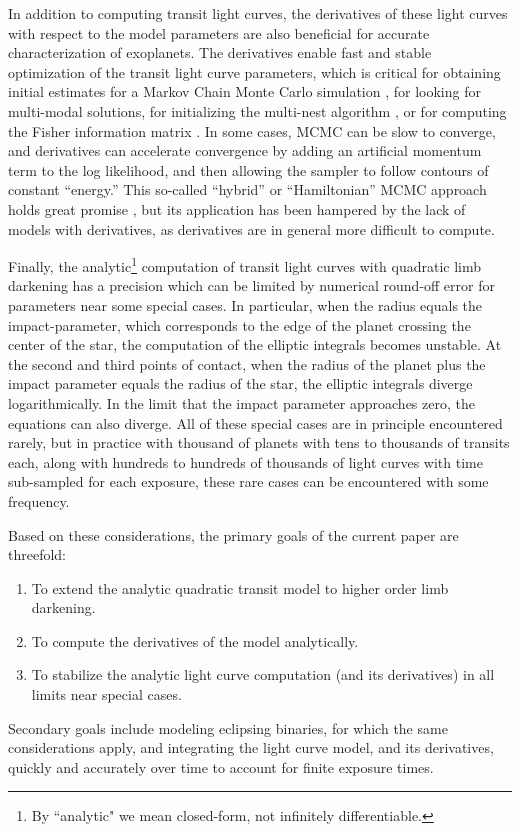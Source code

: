 \documentclass[modern,trackchanges]{aastex63}
\begin{document}
In addition to computing transit light curves, the derivatives of these light
curves with respect to the model parameters are also beneficial for accurate
characterization of exoplanets.   The derivatives enable fast and stable
optimization of the transit light curve parameters, which is critical for
obtaining initial estimates for a Markov Chain Monte Carlo simulation
\citep[MCMC; e.g.][]{Ford2005,Ford2006},
for looking for multi-modal solutions, for initializing the multi-nest
algorithm \citep{Feroz2008}, or for computing the Fisher information matrix 
\citep{Vallisneri2008}.
In some cases, MCMC can be slow to converge, and derivatives can accelerate
convergence by adding an artificial momentum term to the log likelihood,
and then allowing the sampler to follow contours of constant ``energy.''
This so-called ``hybrid'' or ``Hamiltonian'' MCMC approach holds great promise \citep{Neal2011,Girolami2011,Betancourt2017},
but its application has been hampered by the lack of models with derivatives,
as derivatives are in general more difficult to compute.

Finally, the analytic\footnote{By ``analytic" we mean closed-form, not
infinitely differentiable.} computation of transit light curves with quadratic
limb darkening has a precision which can be limited by numerical round-off
error for parameters near some special cases.  In
particular, when the radius equals the impact-parameter, which corresponds to
the edge of the planet crossing the center of the star, the computation of the
elliptic integrals becomes unstable.  At the second and third points of
contact, when the radius of the planet plus the impact parameter equals
the radius of the star, the elliptic integrals diverge logarithmically.  In the
limit that the impact parameter approaches zero, the equations can also
diverge.  All of these special cases are in principle encountered rarely,
but in practice with thousand of planets with tens to thousands of
transits each, along with hundreds to hundreds of thousands of light
curves with time sub-sampled for each exposure, these rare cases can
be encountered with some frequency.

Based on these considerations, the primary goals of the current paper are
threefold:
\begin{enumerate}
\item To extend the analytic quadratic transit model to higher order limb darkening.
\item To compute the derivatives of the model analytically.
\item To stabilize the analytic light curve computation (and its derivatives)
in all limits near special cases.
\end{enumerate}
Secondary goals include modeling eclipsing binaries, for which the same
considerations apply, and integrating the light curve model, and its
derivatives, quickly and accurately over time to account for finite
exposure times.
\end{document}
